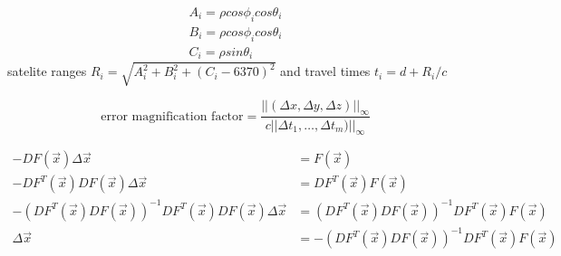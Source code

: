 \documentclass[11pt]{amsart}
\theoremstyle{remark}
\begin{document}
\vspace{2cm}

\begin{align*}
A_i = \rho cos\phi _i cos\theta_i\\
B_i = \rho cos\phi _i cos\theta_i\\
C_i = \rho sin\theta_i
\end{align*}
\vspace{2cm}
satelite ranges $R_i=\sqrt{A_i^2+B_i^2+(C_i-6370)^2}$ and travel times $t_i=d+R_i/c$

\vspace{2cm}

$$\text{error magnification factor} = \frac{||(\Delta x, \Delta y, \Delta z)||_\infty}{c||\Delta t_1, \dots , \Delta t_m)||_\infty}$$


\vspace{2cm}

\begin{align}
-DF(\overrightarrow{x})\Delta \overrightarrow{x}&=F(\overrightarrow{x})&\\
-DF^T(\overrightarrow{x})DF(\overrightarrow{x})\Delta \overrightarrow{x}&=DF^T(\overrightarrow{x})F(\overrightarrow{x})&\\
-(DF^T(\overrightarrow{x})DF(\overrightarrow{x}))^{-1}DF^T(\overrightarrow{x})DF(\overrightarrow{x})\Delta\overrightarrow{x}&=(DF^T(\overrightarrow{x})DF(\overrightarrow{x}))^{-1}DF^T(\overrightarrow{x})F(\overrightarrow{x})\\
\Delta\overrightarrow{x}&=-(DF^T(\overrightarrow{x})DF(\overrightarrow{x}))^{-1}DF^T(\overrightarrow{x})F(\overrightarrow{x})
\end{align}
\end{document}
